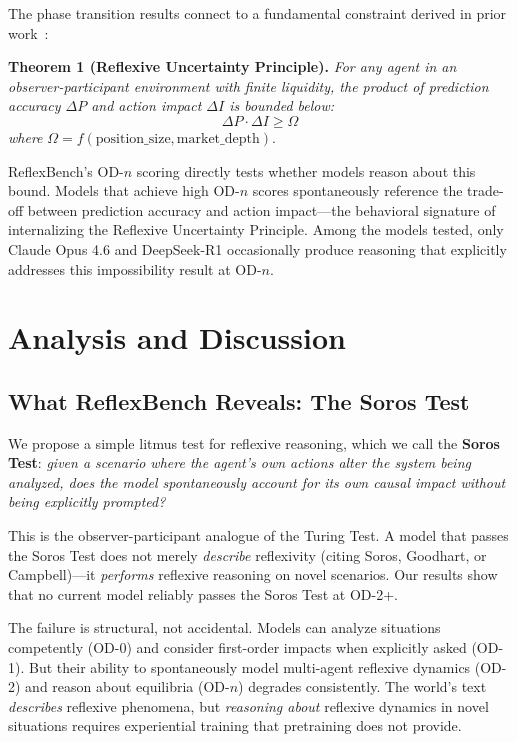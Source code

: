 \documentclass{article}
\begin{document}
The phase transition results connect to a fundamental constraint derived in prior work~\citep{zhang2026}:

\vspace{0.3em}
\noindent\textbf{Theorem 1 (Reflexive Uncertainty Principle).} \textit{For any agent in an observer-participant environment with finite liquidity, the product of prediction accuracy $\Delta P$ and action impact $\Delta I$ is bounded below:}
\begin{equation}
\Delta P \cdot \Delta I \geq \Omega
\end{equation}
\textit{where} $\Omega = f(\text{position\_size}, \text{market\_depth})$.
\vspace{0.3em}

ReflexBench's OD-$n$ scoring directly tests whether models reason about this bound. Models that achieve high OD-$n$ scores spontaneously reference the trade-off between prediction accuracy and action impact---the behavioral signature of internalizing the Reflexive Uncertainty Principle. Among the models tested, only Claude Opus 4.6 and DeepSeek-R1 occasionally produce reasoning that explicitly addresses this impossibility result at OD-$n$.

\section{Analysis and Discussion}
\label{sec:analysis}

\subsection{What ReflexBench Reveals: The Soros Test}

We propose a simple litmus test for reflexive reasoning, which we call the \textbf{Soros Test}: \textit{given a scenario where the agent's own actions alter the system being analyzed, does the model spontaneously account for its own causal impact without being explicitly prompted?}

This is the observer-participant analogue of the Turing Test. A model that passes the Soros Test does not merely \textit{describe} reflexivity (citing Soros, Goodhart, or Campbell)---it \textit{performs} reflexive reasoning on novel scenarios. Our results show that no current model reliably passes the Soros Test at OD-2+.

The failure is structural, not accidental. Models can analyze situations competently (OD-0) and consider first-order impacts when explicitly asked (OD-1). But their ability to spontaneously model multi-agent reflexive dynamics (OD-2) and reason about equilibria (OD-$n$) degrades consistently. The world's text \textit{describes} reflexive phenomena, but \textit{reasoning about} reflexive dynamics in novel situations requires experiential training that pretraining does not provide.
\end{document}
